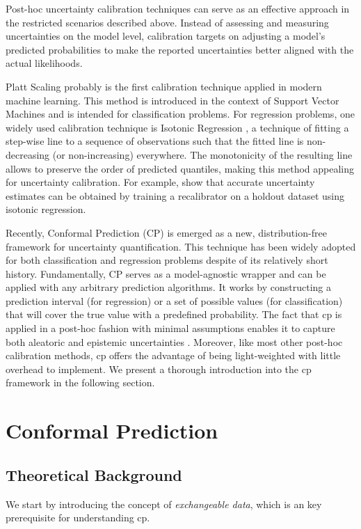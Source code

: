 \vspace{0.3cm}
Post-hoc uncertainty calibration techniques can serve as an effective approach in the restricted scenarios described above. Instead of assessing and measuring uncertainties on the model level, calibration targets on adjusting a model's predicted probabilities to make the reported uncertainties better aligned with the actual likelihoods.

Platt Scaling \cite{platt1999probabilistic} probably is the first calibration technique applied in modern machine learning. This method is introduced in the context of Support Vector Machines and is intended for classification problems. For regression problems, one widely used calibration technique is Isotonic Regression \cite{niculescumizil2005predicting}, a technique of fitting a step-wise line to a sequence of observations such that the fitted line is non-decreasing (or non-increasing) everywhere. The monotonicity of the resulting line allows to preserve the order of predicted quantiles, making this method appealing for uncertainty calibration. For example, \cite{pmlr-v80-kuleshov18a} show that accurate uncertainty estimates can be obtained by training a recalibrator on a holdout dataset using isotonic regression.

Recently, Conformal Prediction (CP) \cite{shafer2008tutorial, vovk2005algorithmic} is emerged as a new, distribution-free framework for uncertainty quantification. This technique has been widely adopted for both classification and regression problems despite of its relatively short history. Fundamentally, CP serves as a model-agnostic wrapper and can be applied with any arbitrary prediction algorithms. It works by constructing a prediction interval (for regression) or a set of possible values (for classification) that will cover the true value with a predefined probability. The fact that \gls{cp} is applied in a post-hoc fashion with minimal assumptions enables it to capture both aleatoric and epistemic uncertainties \cite{mossina2024CVPR}. Moreover, like most other post-hoc calibration methods, \gls{cp} offers the advantage of being light-weighted with little overhead to implement. We present a thorough introduction into the \gls{cp} framework in the following section.

\section{Conformal Prediction}
\label{sec: reviewCP}
\subsection{Theoretical Background}
We start by introducing the concept of \textit{exchangeable data}, which is an key prerequisite for understanding \gls{cp}.
\newline

